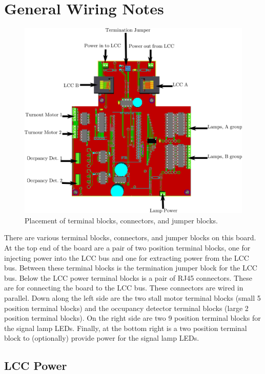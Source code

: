 \section{General Wiring Notes}

\begin{figure}[hbpt]\begin{centering}%
\includegraphics[width=5in]{ESP32HalfSidingWiring.png}
\caption{Placement of terminal blocks, connectors, and jumper blocks.}
\end{centering}\end{figure}
There are various terminal blocks, connectors, and jumper blocks on this
board. At the top end of the board are a pair of two position terminal blocks, 
one for injecting power into the LCC bus and one for extracting power from the 
LCC bus.  Between these terminal blocks is the termination jumper block for 
the LCC bus.  Below the LCC  power terminal blocks is a pair of RJ45 
connectors. These are for connecting the board to the LCC bus.  These 
connectors are wired in parallel.  Down along the left side are the two stall 
motor terminal blocks (small 5 position terminal blocks) and the occupancy 
detector terminal blocks (large 2 position terminal blocks).  On the right 
side are two 9 position terminal blocks for the signal lamp LEDs.  Finally, at 
the bottom right is a two position terminal block to (optionally) provide 
power for the signal lamp LEDs.

\subsection{LCC Power}

